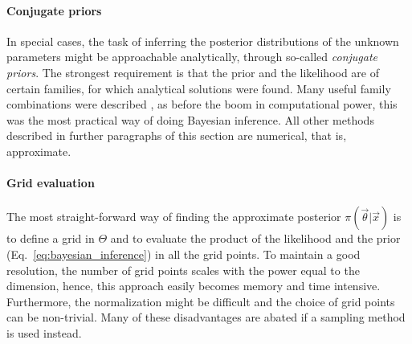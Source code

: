 \paragraph{Conjugate priors}
In special cases, the task of inferring the posterior distributions of the unknown parameters might be approachable analytically, through so-called \textit{conjugate priors}. The strongest requirement is that the prior and the likelihood are of certain families, for which analytical solutions were found. Many useful family combinations were described \cite{fink1997compendium}, as before the boom in computational power, this was the most practical way of doing Bayesian inference. All other methods described in further paragraphs of this section are numerical, that is, approximate.

\paragraph{Grid evaluation}
The most straight-forward way of finding the approximate posterior $\pi(\vec{\theta}|\vec{x})$ is to define a grid in $\Theta$ and to evaluate the product of the likelihood and the prior (Eq.~\ref{eq:bayesian_inference}) in all the grid points. To maintain a good resolution, the number of grid points scales with the power equal to the dimension, hence, this approach easily becomes memory and time intensive. Furthermore, the normalization might be difficult and the choice of grid points can be non-trivial. Many of these disadvantages are abated if a sampling method is used instead. 

